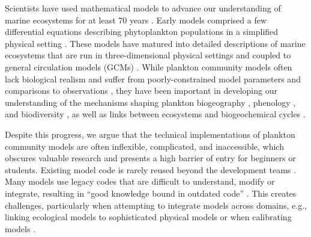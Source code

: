 \documentclass[gmd, manuscript]{copernicus}
\begin{document}
Scientists have used mathematical models to advance our understanding of marine ecosystems for at least 70 years \citep{ Gentleman2002a}. Early models comprised a few differential equations describing phytoplankton populations in a simplified physical setting \citep{Evans1985ACycles, Fasham1990a}. These models have matured into detailed descriptions of marine ecosystems that are run in three-dimensional physical settings and coupled to general circulation models (GCMs) \citep[e.g.][]{Dutkiewicz2020DimensionsDiversity}. While plankton community models often lack biological realism and suffer from poorly-constrained model parameters and comparisons to observations \citep{Anderson2005}, they have been important in developing our understanding of the mechanisms shaping plankton biogeography \citep[e.g.][]{Follows2007EmergentOcean}, phenology \citep[e.g.][]{Taylor1993SeasonalNitrogen}, and biodiversity \citep[e.g.][]{Barton2010b, Acevedo-Trejos2015c}, as well as links between ecosystems and biogeochemical cycles \citep[e.g.][]{Fasham1990a, Sarmiento1998SimulatedWarming, Merico2006IsSystem, Dutkiewicz2009}.

Despite this progress, we argue that the technical implementations of plankton community models are often inflexible, complicated, and inaccessible, which obscures valuable research and presents a high barrier of entry for beginners or students. Existing model code is rarely reused beyond the development teams \citep{Belete2017AnTesting}. Many models use legacy codes that are difficult to understand, modify or integrate, resulting in “good knowledge bound in outdated code” \citep{Argent2004AnSemantics}. This creates challenges, particularly when attempting to integrate models across domains, e.g., linking ecological models to sophisticated physical models \citep{Koralewski2019CouplingModels} or when calibrating models \citep{Steenbeek2021MakingPerspective}. 
\end{document}
